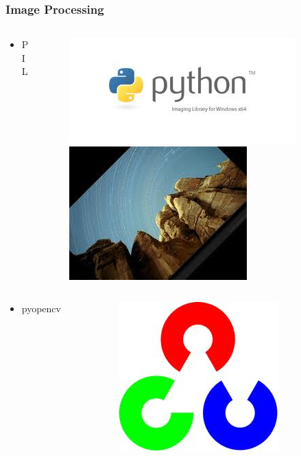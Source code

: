 \documentclass[compress=true]{beamer}
\begin{document}
\begin{frame}
	\frametitle{Image Processing}
	\begin{columns}
		\begin{column}{0.1\textwidth}
			\begin{itemize}
				\item PIL
			\end{itemize}
		\end{column}
		\begin{column}{0.9\textwidth}
			\begin{figure}
				\includegraphics[height=0.3\textheight]{pil.png}
				\includegraphics[height=0.3\textheight]{pil_1.png}
			\end{figure}
		\end{column}
	\end{columns}
	\begin{columns}
		\begin{column}{0.2\textwidth}
			\begin{itemize}
				\item pyopencv
			\end{itemize}
		\end{column}
		\begin{column}{0.4\textwidth}
			\begin{figure}
				\includegraphics[height=0.3\textheight]{opencv.png}
			\end{figure}
		\end{column}
		\begin{column}{0.4\textwidth}


\end{column}
\end{columns}
\end{frame}
\end{document}
